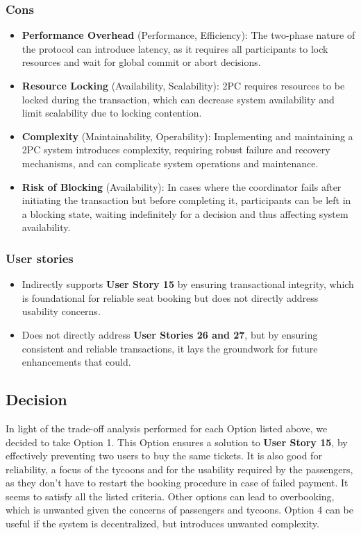 \subsubsection*{Cons}
\begin{itemize}[noitemsep]
    \item \textbf{Performance Overhead} (Performance, Efficiency): The two-phase nature of the protocol can introduce latency, as it requires all participants to lock resources and wait for global commit or abort decisions.
    \item \textbf{Resource Locking} (Availability, Scalability): 2PC requires resources to be locked during the transaction, which can decrease system availability and limit scalability due to locking contention.
    \item \textbf{Complexity} (Maintainability, Operability): Implementing and maintaining a 2PC system introduces complexity, requiring robust failure and recovery mechanisms, and can complicate system operations and maintenance.
    \item \textbf{Risk of Blocking} (Availability): In cases where the coordinator fails after initiating the transaction but before completing it, participants can be left in a blocking state, waiting indefinitely for a decision and thus affecting system availability.
\end{itemize}
\subsubsection*{User stories}
\begin{itemize}
    \item Indirectly supports \textbf{User Story 15} by ensuring transactional integrity, which is foundational for reliable seat booking but does not directly address usability concerns.
    \item Does not directly address \textbf{User Stories 26 and 27}, but by ensuring consistent and reliable transactions, it lays the groundwork for future enhancements that could.
\end{itemize}

\subsection*{Decision}
In light of the trade-off analysis performed for each Option listed above, we decided to take Option 1. 
This Option ensures a solution to \textbf{User Story 15}, by effectively preventing two users to buy the same tickets. 
It is also good for reliability, a focus of the tycoons and for the usability required by the passengers, as they don't have to restart the booking procedure in case of failed payment. It seems to satisfy all the listed criteria.
Other options can lead to overbooking, which is unwanted given the concerns of passengers and tycoons.
Option 4 can be useful if the system is decentralized, but introduces unwanted complexity.

